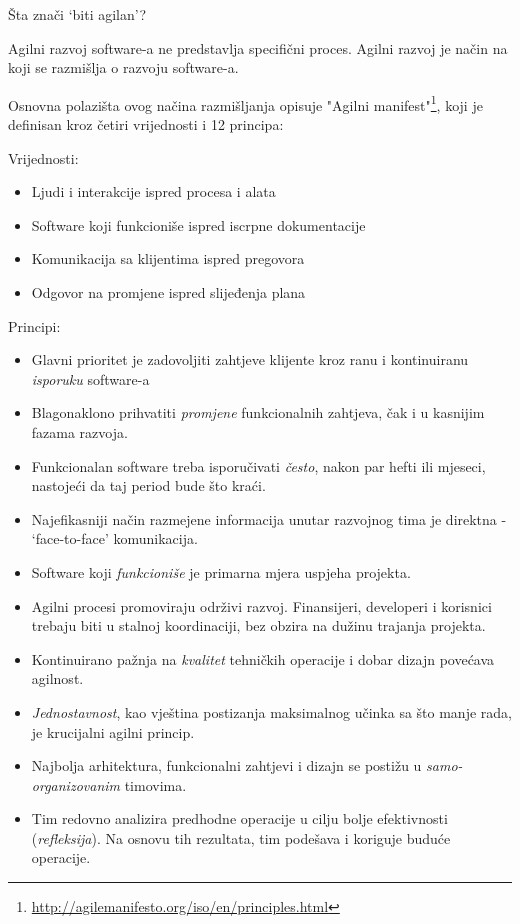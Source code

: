 \documentclass[times, utf8, seminar]{fit}
\begin{document}
Šta znači `biti agilan'?

Agilni razvoj software-a ne predstavlja specifični proces. Agilni razvoj je način na koji se razmišlja o razvoju software-a\citep{agileart}\citep[str. 9]{agileart}.

Osnovna polazišta ovog načina razmišljanja opisuje "Agilni manifest"\footnote{\url{http://agilemanifesto.org/iso/en/principles.html}}, koji je definisan kroz četiri vrijednosti i 12 principa:

Vrijednosti:
\begin{itemize}
\item Ljudi i interakcije ispred procesa i alata
\item Software koji funkcioniše ispred iscrpne dokumentacije
\item Komunikacija sa klijentima ispred pregovora
\item Odgovor na promjene ispred slijeđenja plana
\end{itemize}

Principi:
\begin{itemize}
\item Glavni prioritet je zadovoljiti zahtjeve klijente kroz ranu i kontinuiranu \emph{isporuku} software-a
\item Blagonaklono prihvatiti \emph{promjene} funkcionalnih zahtjeva, čak i u kasnijim fazama razvoja.
\item Funkcionalan software treba isporučivati \emph{često}, nakon par hefti ili mjeseci, nastojeći da taj period bude što kraći.
\item Najefikasniji način razmejene informacija unutar razvojnog tima je direktna - `face-to-face' komunikacija.
\item Software koji \emph{funkcioniše} je primarna mjera uspjeha projekta.
\item Agilni procesi promoviraju održivi razvoj. Finansijeri, developeri i korisnici trebaju biti u stalnoj koordinaciji, bez obzira na dužinu trajanja projekta.
\item Kontinuirano pažnja na \emph{kvalitet} tehničkih operacije i dobar dizajn povećava agilnost.
\item \emph{Jednostavnost}, kao vještina postizanja maksimalnog učinka sa što manje rada, je krucijalni agilni princip.
\item Najbolja arhitektura, funkcionalni zahtjevi i dizajn se postižu u \emph{samo-organizovanim} timovima.
\item Tim redovno analizira predhodne operacije u cilju bolje efektivnosti (\emph{refleksija}). Na osnovu tih rezultata, tim podešava i koriguje buduće operacije.
\end{itemize}
\end{document}
